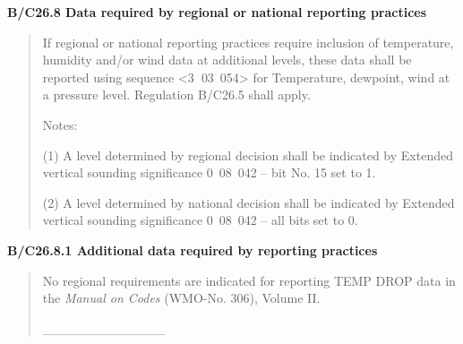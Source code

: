 \textbf{B/C26.8 Data required by regional or national reporting practices}

\begin{quote}
If regional or national reporting practices require inclusion of temperature, humidity and/or wind data at additional levels, these data shall be reported using sequence \textless3\textbf{~}03~054\textgreater{} for Temperature, dewpoint, wind at a pressure level. Regulation B/C26.5 shall apply.

Notes:

(1) A level determined by regional decision shall be indicated by Extended vertical sounding significance 0~08~042 -- bit No. 15 set to 1.

(2) A level determined by national decision shall be indicated by Extended vertical sounding significance 0~08~042 -- all bits set to 0.
\end{quote}

\textbf{B/C26.8.1 Additional data required by reporting practices}

\begin{quote}
No regional requirements are indicated for reporting TEMP DROP data in the \emph{Manual on Codes} (WMO-No. 306), Volume II.

\_\_\_\_\_\_\_\_\_\_\_\_\_
\end{quote}
